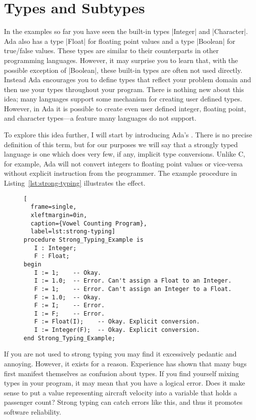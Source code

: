 \section{Types and Subtypes}

In the examples so far you have seen the built-in types |Integer| and |Character|. Ada also has
a type |Float| for floating point values and a type |Boolean| for true/false values. These types
are similar to their counterparts in other programming languages. However, it may surprise you
to learn that, with the possible exception of |Boolean|, these built-in types are often not used
directly. Instead Ada encourages you to define types that reflect your problem domain and then
use your types throughout your program. There is nothing new about this idea; many languages
support some mechanism for creating user defined types. However, in Ada it is possible to create
even user defined integer, floating point, and character types---a feature many languages do not
support.

To explore this idea further, I will start by introducing Ada's . There
is no precise definition of this term, but for our purposes we will say that a strongly typed
language is one which does very few, if any, implicit type conversions. Unlike C, for example,
Ada will not convert integers to floating point values or vice-versa without explicit
instruction from the programmer. The example procedure in Listing~\ref{lst:strong-typing}
illustrates the effect.

\begin{figure}[tbhp]
\begin{lstlisting}[
  frame=single,
  xleftmargin=0in,
  caption={Vowel Counting Program},
  label=lst:strong-typing]
procedure Strong_Typing_Example is
   I : Integer;
   F : Float;
begin
   I := 1;    -- Okay.
   I := 1.0;  -- Error. Can't assign a Float to an Integer.
   F := 1;    -- Error. Can't assign an Integer to a Float.
   F := 1.0;  -- Okay.
   F := I;    -- Error.
   I := F;    -- Error.
   F := Float(I);    -- Okay. Explicit conversion.
   I := Integer(F);  -- Okay. Explicit conversion.
end Strong_Typing_Example;
\end{lstlisting}
\end{figure}

If you are not used to strong typing you may find it excessively pedantic and annoying. However,
it exists for a reason. Experience has shown that many bugs first manifest themselves as
confusion about types. If you find yourself mixing types in your program, it may mean that you
have a logical error. Does it make sense to put a value representing aircraft velocity into a
variable that holds a passenger count? Strong typing can catch errors like this, and thus it
promotes software reliability.

